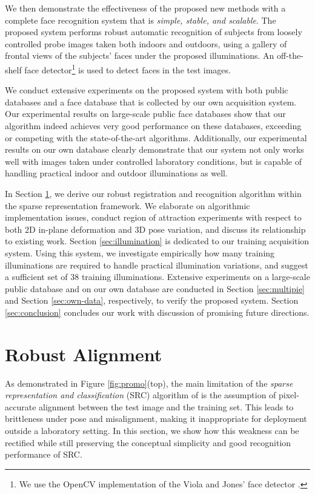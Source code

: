 \documentclass[12pt,journal,draftcls,letterpaper,onecolumn]{IEEEtran}
\begin{document}
We then demonstrate the effectiveness of the proposed new
methods with a complete face recognition system that is {\em
simple, stable, and scalable}. The proposed system performs
robust automatic recognition of subjects from loosely
controlled probe images taken both indoors and outdoors, 
using a gallery of 
frontal views of the subjects' faces under the proposed
illuminations. An off-the-shelf face
detector\footnote{We use the OpenCV
implementation of the Viola and Jones' face detector
\cite{Viola2004-IJCV}.} is used to detect faces in the test images.

We conduct extensive experiments on the proposed system with
both public databases and a face database that is collected by
our own acquisition system. Our experimental results on
large-scale public face databases show that our algorithm
indeed achieves very good performance on these databases,
exceeding or competing with the state-of-the-art algorithms. 
Additionally, our experimental results on our own database
clearly demonstrate that our system not only works well with
images taken under controlled laboratory conditions, but is
capable of handling practical indoor and outdoor illuminations as well.

 In Section \ref{sec:registration},
we derive our robust registration and recognition algorithm within the sparse
representation framework. We elaborate on algorithmic implementation issues,
conduct region of attraction experiments with respect to both 2D in-plane
deformation and 3D pose variation, and discuss its relationship to existing
work. Section \ref{sec:illumination} is dedicated to our training acquisition
system. Using this system, we investigate empirically how many training
illuminations are required to handle practical illumination variations, and
suggest a sufficient set of 38 training illuminations. Extensive experiments on
a large-scale public database and on our own database are conducted in Section
\ref{sec:multipie} and Section \ref{sec:own-data}, respectively, to verify the
proposed system. Section \ref{sec:conclusion} concludes our work with
discussion of promising future directions.

\section{Robust Alignment}\label{sec:registration}
As demonstrated in Figure \ref{fig:promo}(top), the main
limitation of the {\em sparse representation and
classification} (SRC) algorithm of \cite{Wright2009-PAMI} is
the assumption of pixel-accurate alignment between the test
image and the training set. This leads to brittleness under
pose and misalignment, making it inappropriate for deployment
outside a laboratory setting. In this section, we show how this
weakness can be rectified while still preserving the conceptual
simplicity and good recognition performance of SRC.
\end{document}
